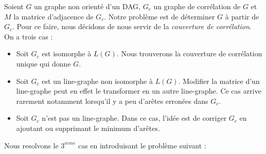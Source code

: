 Soient $G$ un graphe non orient\'e d'un DAG,
 $G_c$ un graphe de corr\'elation de $G$ et 
 $M$ la matrice d'adjacence de $G_c$.
 \newline
 Notre probl\`eme est de d\'eterminer $G$ \`a partir de $G_c$. Pour ce faire, nous d\'ecidons de nous servir de la {\em couverture de corr\'elation}.
On a trois cas :
\begin{itemize}
	\item Soit $G_c$ est isomorphe \`a $L(G)$. Nous trouverons la couverture de corr\'elation unique qui donne $G$.
	\item Soit $G_c$ est un line-graphe non isomorphe \`a $L(G)$. 
		Modifier la matrice d'un line-graphe peut en effet le transformer en un autre line-graphe. Ce cas arrive rarement notamment lorsqu'il y a peu d'ar\^etes erron\'ees dans $G_c$. 
	\item Soit $G_c$ n'est pas un line-graphe. Dans ce cas, l'id\'ee est de corriger $G_c$ en ajoutant ou supprimant le minimum d'ar\^etes.
\end{itemize}
Nous resolvons le $3^{ieme}$ cas en introduisant le probl\`eme suivant :

